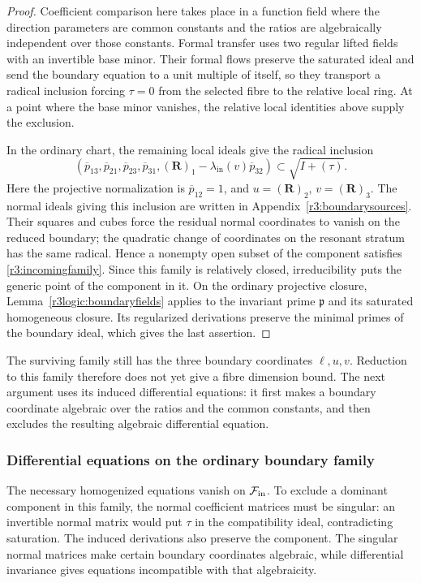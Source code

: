 \documentclass[11pt,a4paper]{article}
\numberwithin{equation}{section}
\theoremstyle{plain}
\theoremstyle{definition}
\theoremstyle{remark}
\begin{document}
\begin{proof}
Coefficient comparison here takes place in a function field
where the direction parameters are common constants and the
ratios are algebraically independent over those constants.
Formal transfer uses two regular lifted fields with an
invertible base minor. Their formal flows preserve the saturated
ideal and send the boundary equation to a unit multiple of
itself, so they transport a radical inclusion forcing $\tau=0$
from the selected fibre to the relative local ring. At a point
where the base minor vanishes, the relative local identities
above supply the exclusion.

In the ordinary chart, the remaining local ideals give the
radical inclusion
\[
 (\overline p_{13},\overline p_{21},\overline p_{23},
   \overline p_{31},
   (\boldsymbol R)_1-\lambda_{\mathrm{in}}(v)\overline p_{32})
       \subset\sqrt{I+(\tau)}.
\]
Here the projective normalization is $\overline p_{12}=1$,
and $u=(\boldsymbol R)_2$, $v=(\boldsymbol R)_3$. The normal ideals giving this inclusion
are written in Appendix~\ref{r3:boundarysources}. Their squares
and cubes force the residual normal coordinates to vanish on
the reduced boundary; the quadratic change of coordinates on
the resonant stratum has the same radical. Hence a nonempty
open subset of the component satisfies
\eqref{r3:incomingfamily}.
Since this family is relatively closed, irreducibility puts the
generic point of the component in it. On the ordinary projective closure,
Lemma~\ref{r3logic:boundaryfields} applies to the invariant
prime $\mathfrak p$ and its saturated homogeneous closure. Its regularized
derivations preserve the minimal primes of the boundary ideal,
which gives the last assertion.
\end{proof}

The surviving family still has the three boundary coordinates
$\ell,u,v$. Reduction to this family therefore does not yet give
a fibre dimension bound. The next argument uses its induced
differential equations: it first makes a boundary coordinate
algebraic over the ratios and the common constants, and then
excludes the resulting algebraic differential equation.

\subsubsection{Differential equations on the ordinary boundary family}

The necessary homogenized equations vanish on
$\mathcal F_{\rm in}$. To exclude a dominant component in this family,
the normal coefficient matrices must be singular: an invertible
normal matrix would put $\tau$ in the compatibility ideal,
contradicting saturation. The induced derivations also preserve the
component. The singular normal matrices make certain boundary
coordinates algebraic, while differential invariance gives equations
incompatible with that algebraicity.
\end{document}
